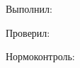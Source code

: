 \begin{titlepage}

    \begin{center}

        {\Large\ESKDtheCompany\par}

        \vspace{1cm}

        {\ESKDtheDepartment\par}

        \vfill

        {\Large\bfseries\ESKDtheTitle\par}

        \vspace{0.5cm}

        {\ESKDtheDocName\par}

        \vfill

    \end{center}

    \begin{flushright}
        Выполнил: \ESKDtheAuthor\par
        Проверил: \ESKDtheChecker\par
        Нормоконтроль: \ESKDtheNormContr\par
    \end{flushright}

    \vfill

    \begin{center}
        {\ESKDtheYear\par}
    \end{center}

\end{titlepage}